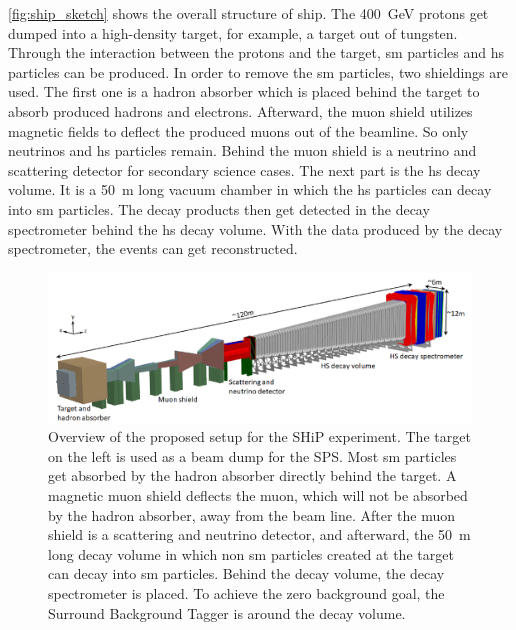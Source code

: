 \autoref{fig:ship_sketch} shows the overall structure of \ac{ship}.
The \SI{400}{\giga\electronvolt} protons get dumped into a high-density target, for example, a target out of tungsten.
Through the interaction between the protons and the target, \ac{sm} particles and \ac{hs} particles can be produced.
In order to remove the \ac{sm} particles, two shieldings are used.
The first one is a hadron absorber which is placed behind the target to absorb produced hadrons and electrons.
Afterward, the muon shield utilizes magnetic fields to deflect the produced muons out of the beamline.
So only neutrinos and \ac{hs} particles remain.
Behind the muon shield is a neutrino and scattering detector for secondary science cases.
The next part is the \ac{hs} decay volume.
It is a \SI{50}{\meter} long vacuum chamber in which the \ac{hs} particles can decay into \ac{sm} particles.
The decay products then get detected in the decay spectrometer behind the \ac{hs} decay volume.
With the data produced by the decay spectrometer, the events can get reconstructed.
\begin{figure}
	\centering
	\includegraphics[width=1.\textwidth]{pictures/ship_sketch}
	\caption[Overview of the SHiP experiment.]{Overview of the proposed setup for the SHiP experiment. The target on the left is used as a beam dump for the SPS. Most \ac{sm} particles get absorbed by the hadron absorber directly behind the target. A magnetic muon shield deflects the muon, which will not be absorbed by the hadron absorber, away from the beam line. After the muon shield is a scattering and neutrino detector, and afterward, the \SI{50}{\meter} long decay volume in which non \ac{sm} particles created at the target can decay into \ac{sm} particles. Behind the decay volume, the decay spectrometer is placed. To achieve the zero background goal, the Surround Background Tagger is around the decay volume. \cite{ship_coll}}
	\label{fig:ship_sketch}
\end{figure}

